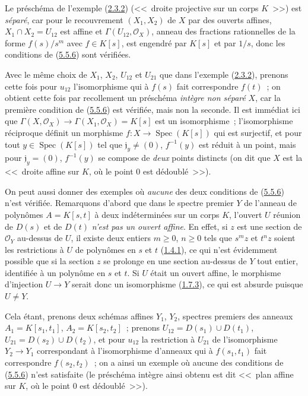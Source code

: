 \begin{examples}[5.5.11]
\label{I.5.5.11-fr}
Le préschéma de l'exemple (\hyperref[I.2.3.2-fr]{2.3.2})
(<<~droite projective sur un corps $K$~>>) est \emph{séparé}, car pour le
recouvrement $(X_1,X_2)$ de $X$ par des ouverts affines,
$X_1\cap X_2=U_{12}$ est affine et $\Gamma(U_{12},\mathscr{O}_X)$, anneau des
fractions rationnelles de la forme $f(s)/s^m$ avec $f\in K[s]$, est engendré
par $K[s]$ et par $1/s$, donc les conditions de
(\hyperref[I.5.5.6-fr]{5.5.6}) sont vérifiées.

Avec le même choix de $X_1$, $X_2$, $U_{12}$ et $U_{21}$ que dans l'exemple
(\hyperref[I.2.3.2-fr]{2.3.2}), prenons cette fois pour $u_{12}$
l'isomorphisme qui à $f(s)$ fait correspondre $f(t)$~; on obtient cette fois
par recollement un préschéma \emph{intègre non séparé} $X$, car la première
condition de (\hyperref[I.5.5.6-fr]{5.5.6}) est vérifiée, mais non la seconde.
Il est immédiat ici que
$\Gamma(X,\mathscr{O}_X)\to\Gamma(X_1,\mathscr{O}_X)=K[s]$ est un
isomorphisme~; l'isomorphisme réciproque définit un morphisme
$f:X\to\operatorname{Spec}(K[s])$ qui est surjectif, et pour tout
$y\in\operatorname{Spec}(K[s])$ tel que $\mathfrak{j}_y\neq(0)$,
$f^{-1}(y)$ est réduit à un point, mais pour $\mathfrak{j}_y=(0)$,
$f^{-1}(y)$ se compose de \emph{deux} points distincts (on dit que $X$ est la
<<~droite affine sur $K$, où le point $0$ est dédoublé~>>).

On peut aussi donner des exemples où \emph{aucune} des deux conditions de
(\hyperref[I.5.5.6-fr]{5.5.6}) n'est vérifiée. Remarquons d'abord que dans le
spectre premier $Y$ de l'anneau de polynômes $A=K[s,t]$ à deux indéterminées
sur un corps $K$, l'ouvert $U$ réunion de $D(s)$ et de $D(t)$ \emph{n'est pas
un ouvert affine}. En effet, si $z$ est une section de $\mathscr{O}_Y$
au-dessus de $U$, il existe deux entiers $m\geq0$, $n\geq0$ tels que $s^m z$
et $t^n z$ soient les restrictions à $U$ de polynômes en $s$ et $t$
(\hyperref[I.1.4.1-fr]{1.4.1}), ce qui n'est évidemment possible que si la
section $z$ se prolonge en une section au-dessus de $Y$ tout entier,
identifiée à un polynôme en $s$ et $t$. Si $U$ était un ouvert affine, le
morphisme d'injection $U\to Y$ serait donc un isomorphisme
(\hyperref[I.1.7.3-fr]{1.7.3}), ce qui est absurde puisque $U\neq Y$.

Cela étant, prenons deux schémas affines $Y_1$, $Y_2$, spectres premiers des
anneaux $A_1=K[s_1,t_1]$, $A_2=K[s_2,t_2]$~; prenons
$U_{12}=D(s_1)\cup D(t_1)$, $U_{21}=D(s_2)\cup D(t_2)$, et pour $u_{12}$ la
restriction à $U_{21}$ de l'isomorphisme $Y_2\to Y_1$ correspondant à
l'isomorphisme d'anneaux qui à $f(s_1,t_1)$ fait correspondre $f(s_2,t_2)$~;
on a ainsi un exemple où aucune des conditions de
(\hyperref[I.5.5.6-fr]{5.5.6}) n'est satisfaite (le préschéma intègre ainsi
obtenu est dit <<~plan affine sur $K$, où le point $0$ est dédoublé~>>).
\end{examples}

